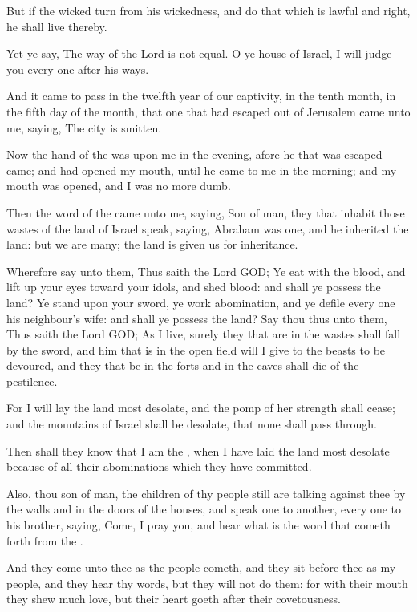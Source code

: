 \verse But if the wicked turn from his wickedness, and do that which is lawful and right, he shall live thereby.

\verse Yet ye say, The way of the Lord is not equal. O ye house of Israel, I will judge you every one after his ways.

\verse And it came to pass in the twelfth year of our captivity, in the tenth month, in the fifth day of the month, that one that had escaped out of Jerusalem came unto me, saying, The city is smitten.

\verse Now the hand of the \LORD was upon me in the evening, afore he that was escaped came; and had opened my mouth, until he came to me in the morning; and my mouth was opened, and I was no more dumb.

\verse Then the word of the \LORD came unto me, saying, \verse Son of man, they that inhabit those wastes of the land of Israel speak, saying, Abraham was one, and he inherited the land: but we are many; the land is given us for inheritance.

\verse Wherefore say unto them, Thus saith the Lord GOD; Ye eat with the blood, and lift up your eyes toward your idols, and shed blood: and shall ye possess the land?  \verse Ye stand upon your sword, ye work abomination, and ye defile every one his neighbour's wife: and shall ye possess the land?  \verse Say thou thus unto them, Thus saith the Lord GOD; As I live, surely they that are in the wastes shall fall by the sword, and him that is in the open field will I give to the beasts to be devoured, and they that be in the forts and in the caves shall die of the pestilence.

\verse For I will lay the land most desolate, and the pomp of her strength shall cease; and the mountains of Israel shall be desolate, that none shall pass through.

\verse Then shall they know that I am the \LORD, when I have laid the land most desolate because of all their abominations which they have committed.

\verse Also, thou son of man, the children of thy people still are talking against thee by the walls and in the doors of the houses, and speak one to another, every one to his brother, saying, Come, I pray you, and hear what is the word that cometh forth from the \LORD.

\verse And they come unto thee as the people cometh, and they sit before thee as my people, and they hear thy words, but they will not do them: for with their mouth they shew much love, but their heart goeth after their covetousness.

